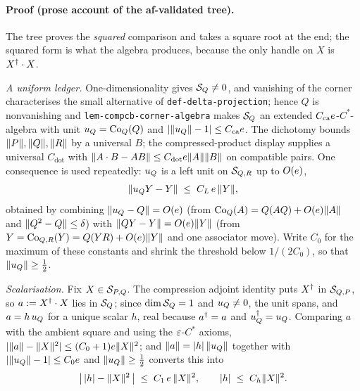 \paragraph{Proof (prose account of the af-validated tree).}
The tree proves the \emph{squared} comparison and takes a square root at the end; the
squared form is what the algebra produces, because the only handle on $X$ is
$X^{\dagger}\mathbin{\cdot} X$.

\emph{A uniform ledger.} One-dimensionality gives $\mathcal S_{Q}\ne0$, and vanishing of the
corner characterises the small alternative of \texttt{def-delta-projection}; hence $Q$ is
nonvanishing and \texttt{lem-compcb-corner-algebra} makes $\mathcal S_{Q}$ an extended
$C_{\mathrm{ca}}e$-$C^*$-algebra with unit $u_{Q}=\mathrm{Co}_{Q}(Q)$ and
$\lvert\lVert u_{Q}\rVert-1\rvert\le C_{\mathrm{ca}}e$. The dichotomy bounds
$\lVert P\rVert,\lVert Q\rVert,\lVert R\rVert$ by a universal $B$; the compressed-product display supplies a
universal $C_{\mathrm{dot}}$ with
$\lVert A\mathbin{\cdot} B-AB\rVert\le C_{\mathrm{dot}}e\lVert A\rVert\lVert B\rVert$ on compatible pairs. One
consequence is used repeatedly: $u_{Q}$ is a left unit on $\mathcal S_{Q,R}$ up to
$O(e)$,
\begin{equation}\label{eq:pqr-leftunit}
  \lVert u_{Q}Y-Y\rVert\;\le\;C_L\,e\,\lVert Y\rVert,
\end{equation}
obtained by combining $\lVert u_{Q}-Q\rVert=O(e)$ (from
$\mathrm{Co}_{Q}(A)=Q(AQ)+O(e)\lVert A\rVert$ and $\lVert Q^{2}-Q\rVert\le\delta$) with
$\lVert QY-Y\rVert=O(e)\lVert Y\rVert$ (from $Y=\mathrm{Co}_{Q,R}(Y)=Q(YR)+O(e)\lVert Y\rVert$ and one
associator move). Write $C_0$ for the maximum of these constants and shrink the threshold
below $1/(2C_0)$, so that $\lVert u_{Q}\rVert\ge\tfrac12$.

\emph{Scalarisation.} Fix $X\in\mathcal S_{P,Q}$. The compression adjoint identity puts $X^{\dagger}$
in $\mathcal S_{Q,P}$, so $a:=X^{\dagger}\mathbin{\cdot} X$ lies in $\mathcal S_{Q}$; since $\dim\mathcal S_{Q}=1$ and
$u_{Q}\ne0$, the unit spans, and $a=h\,u_{Q}$ for a unique scalar $h$, real
because $a^{\dagger}=a$ and $u_{Q}^{\dagger}=u_{Q}$. Comparing $a$ with the ambient square and
using the $\varepsilon$-$C^*$ axioms,
$\lvert\lVert a\rVert-\lVert X\rVert^{2}\rvert\le(C_0+1)e\lVert X\rVert^{2}$; and
$\lVert a\rVert=\lvert h\rvert\,\lVert u_{Q}\rVert$ together with
$\lvert\lVert u_{Q}\rVert-1\rvert\le C_0e$ and $\lVert u_{Q}\rVert\ge\tfrac12$ converts this
into
\begin{equation}\label{eq:pqr-coeff}
  \bigl\lvert\,\lvert h\rvert-\lVert X\rVert^{2}\,\bigr\rvert\;\le\;C_1\,e\,\lVert X\rVert^{2},
  \qquad \lvert h\rvert\;\le\;C_h\lVert X\rVert^{2}.
\end{equation}

